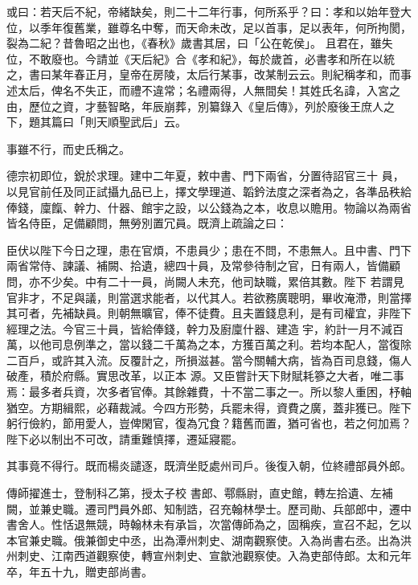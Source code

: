 \begin{pinyinscope}
 或曰：若天后不紀，帝緒缺矣，則二十二年行事，何所系乎？曰：孝和以始年登大位，以季年復舊業，雖尊名中奪，而天命未改，足以首事，足以表年，何所拘閡，裂為二紀？昔魯昭之出也，《春秋》歲書其居，曰「公在乾侯」。
 且君在，雖失位，不敢廢也。今請並《天后紀》合《孝和紀》，每於歲首，必書孝和所在以統之，書曰某年春正月，皇帝在房陵，太后行某事，改某制云云。則紀稱孝和，而事述太后，俾名不失正，而禮不違常；名禮兩得，人無間矣！其姓氏名諱，入宮之由，歷位之資，才藝智略，年辰崩葬，別纂錄入《皇后傳》，列於廢後王庶人之下，題其篇曰「則天順聖武后」云。



 事雖不行，而史氏稱之。



 德宗初即位，銳於求理。建中二年夏，敕中書、門下兩省，分置待詔官三十
 員，以見官前任及同正試攝九品已上，擇文學理道、韜鈐法度之深者為之，各準品秩給俸錢，廩餼、幹力、什器、館宇之設，以公錢為之本，收息以贍用。物論以為兩省皆名侍臣，足備顧問，無勞別置冗員。既濟上疏論之曰：



 臣伏以陛下今日之理，患在官煩，不患員少；患在不問，不患無人。且中書、門下兩省常侍、諫議、補闕、拾遺，總四十員，及常參待制之官，日有兩人，皆備顧問，亦不少矣。中有二十一員，尚闕人未充，他司缺職，累倍其數。陛下
 若謂見官非才，不足與議，則當選求能者，以代其人。若欲務廣聰明，畢收淹滯，則當擇其可者，先補缺員。則朝無曠官，俸不徒費。且夫置錢息利，是有司權宜，非陛下經理之法。今官三十員，皆給俸錢，幹力及廚廩什器、建造宇，約計一月不減百萬，以他司息例準之，當以錢二千萬為之本，方獲百萬之利。若均本配人，當復除二百戶，或許其入流。反覆計之，所損滋甚。當今關輔大病，皆為百司息錢，傷人破產，積於府縣。實思改革，以正本
 源。又臣嘗計天下財賦耗篸之大者，唯二事焉：最多者兵資，次多者官俸。其餘雜費，十不當二事之一。所以黎人重困，杼軸猶空。方期緝熙，必藉裁減。今四方形勢，兵罷未得，資費之廣，蓋非獲已。陛下躬行儉約，節用愛人，豈俾閑官，復為冗食？籍舊而置，猶可省也，若之何加焉？陛下必以制出不可改，請重難慎擇，遷延寢罷。



 其事竟不得行。既而楊炎譴逐，既濟坐貶處州司戶。後復入朝，位終禮部員外郎。



 傳師擢進士，登制科乙第，授太子校
 書郎、鄠縣尉，直史館，轉左拾遺、左補闕，並兼史職。遷司門員外郎、知制誥，召充翰林學士。歷司勛、兵部郎中，遷中書舍人。性恬退無競，時翰林未有承旨，次當傳師為之，固稱疾，宣召不起，乞以本官兼史職。俄兼御史中丞，出為潭州刺史、湖南觀察使。入為尚書右丞。出為洪州刺史、江南西道觀察使，轉宣州刺史、宣歙池觀察使。入為吏部侍郎。太和元年卒，年五十九，贈吏部尚書。




\end{pinyinscope}
